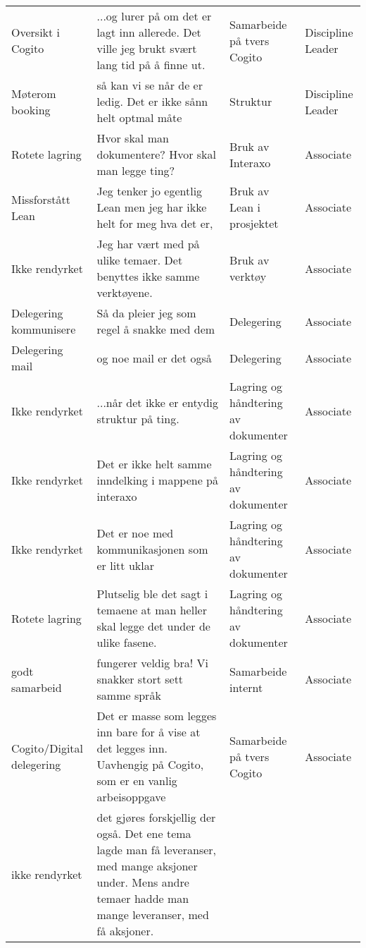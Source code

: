 \begin{landscape}
\begin{longtable}{p{0.25\textheight}p{0.5\textheight}p{0.25\textheight}p{0.25\textheight}}
    Oversikt i Cogito &
      ...og lurer på om det er lagt inn allerede. Det ville jeg brukt svært lang tid på å finne ut. &
      Samarbeide på tvers Cogito &
      Discipline Leader \\
    Møterom booking &
      så kan vi se når de er ledig. Det er ikke sånn helt optmal måte &
      Struktur &
      Discipline Leader \\
    Rotete lagring &
      Hvor skal man dokumentere? Hvor skal man legge ting? &
      Bruk av Interaxo &
      Associate \\
    Missforstått Lean &
      Jeg tenker jo egentlig Lean men jeg har ikke helt for meg hva det er, &
      Bruk av Lean i prosjektet &
      Associate \\
    Ikke rendyrket &
      Jeg har vært med på ulike temaer. Det benyttes ikke samme verktøyene. &
      Bruk av verktøy &
      Associate \\
    Delegering kommunisere &
      Så da pleier jeg som regel å snakke med dem &
      Delegering &
      Associate \\
    Delegering mail &
      og noe mail er det også &
      Delegering &
      Associate \\
    Ikke rendyrket &
      ...når det ikke er entydig struktur på ting. &
      Lagring og håndtering av dokumenter &
      Associate \\
    Ikke rendyrket &
      Det er ikke helt samme inndelking i mappene på interaxo &
      Lagring og håndtering av dokumenter &
      Associate \\
    Ikke rendyrket &
      Det er noe med kommunikasjonen som er litt uklar &
      Lagring og håndtering av dokumenter &
      Associate \\
    Rotete lagring &
      Plutselig ble det sagt i temaene at man heller skal legge det under de ulike fasene. &
      Lagring og håndtering av dokumenter &
      Associate \\
    godt samarbeid &
      fungerer veldig bra! Vi snakker stort sett samme språk &
      Samarbeide internt &
      Associate \\
    Cogito/Digital delegering &
      Det er masse som legges inn bare for å vise at det legges inn. Uavhengig på Cogito, som er en vanlig arbeisoppgave &
      Samarbeide på tvers Cogito &
      Associate \\
    ikke rendyrket &
      det gjøres forskjellig der også. Det ene tema lagde man få leveranser, med mange aksjoner under. Mens andre temaer hadde man mange leveranser, med få aksjoner. &

\end{longtable}
\end{landscape}
